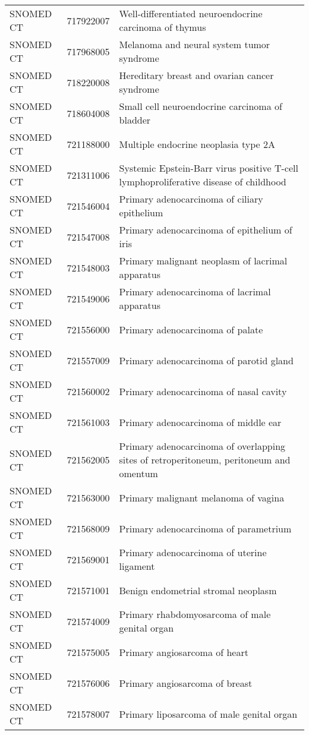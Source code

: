 \begin{longtable}{p{}p{}p{}}
  SNOMED CT & 717922007 & Well-differentiated neuroendocrine carcinoma of thymus \\ 
  SNOMED CT & 717968005 & Melanoma and neural system tumor syndrome \\ 
  SNOMED CT & 718220008 & Hereditary breast and ovarian cancer syndrome \\ 
  SNOMED CT & 718604008 & Small cell neuroendocrine carcinoma of bladder \\ 
  SNOMED CT & 721188000 & Multiple endocrine neoplasia type 2A \\ 
  SNOMED CT & 721311006 & Systemic Epstein-Barr virus positive T-cell lymphoproliferative disease of childhood \\ 
  SNOMED CT & 721546004 & Primary adenocarcinoma of ciliary epithelium \\ 
  SNOMED CT & 721547008 & Primary adenocarcinoma of epithelium of iris \\ 
  SNOMED CT & 721548003 & Primary malignant neoplasm of lacrimal apparatus \\ 
  SNOMED CT & 721549006 & Primary adenocarcinoma of lacrimal apparatus \\ 
  SNOMED CT & 721556000 & Primary adenocarcinoma of palate \\ 
  SNOMED CT & 721557009 & Primary adenocarcinoma of parotid gland \\ 
  SNOMED CT & 721560002 & Primary adenocarcinoma of nasal cavity \\ 
  SNOMED CT & 721561003 & Primary adenocarcinoma of middle ear \\ 
  SNOMED CT & 721562005 & Primary adenocarcinoma of overlapping sites of retroperitoneum, peritoneum and omentum \\ 
  SNOMED CT & 721563000 & Primary malignant melanoma of vagina \\ 
  SNOMED CT & 721568009 & Primary adenocarcinoma of parametrium \\ 
  SNOMED CT & 721569001 & Primary adenocarcinoma of uterine ligament \\ 
  SNOMED CT & 721571001 & Benign endometrial stromal neoplasm \\ 
  SNOMED CT & 721574009 & Primary rhabdomyosarcoma of male genital organ \\ 
  SNOMED CT & 721575005 & Primary angiosarcoma of heart \\ 
  SNOMED CT & 721576006 & Primary angiosarcoma of breast \\ 
  SNOMED CT & 721578007 & Primary liposarcoma of male genital organ \\ 

\end{longtable}
